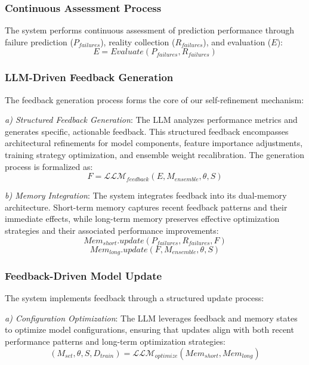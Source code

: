 \documentclass[conference]{IEEEtran}
\begin{document}
\subsubsection{Continuous Assessment Process}
The system performs continuous assessment of prediction performance through failure prediction ($P_{failures}$), reality collection ($R_{failures}$), and evaluation ($E$):
\begin{equation}
    E = Evaluate(P_{failures}, R_{failures})
\end{equation}

\subsubsection{LLM-Driven Feedback Generation}
The feedback generation process forms the core of our self-refinement mechanism:

\textit{a) Structured Feedback Generation}: The LLM analyzes performance metrics and generates specific, actionable feedback. This structured feedback encompasses architectural refinements for model components, feature importance adjustments, training strategy optimization, and ensemble weight recalibration. The generation process is formalized as:
\begin{equation}
    F = \mathcal{LLM}_{feedback}(E, M_{ensemble}, \theta, S)
\end{equation}

\textit{b) Memory Integration}: The system integrates feedback into its dual-memory architecture. Short-term memory captures recent feedback patterns and their immediate effects, while long-term memory preserves effective optimization strategies and their associated performance improvements:
\begin{equation}
    Mem_{short}.update(P_{failures}, R_{failures}, F)
\end{equation}
\begin{equation}
    Mem_{long}.update(F, M_{ensemble}, \theta, S)
\end{equation}

\subsubsection{Feedback-Driven Model Update}
The system implements feedback through a structured update process:

\textit{a) Configuration Optimization}: The LLM leverages feedback and memory states to optimize model configurations, ensuring that updates align with both recent performance patterns and long-term optimization strategies:
\begin{equation}
    (M_{set}, \theta, S, D_{train}) = \mathcal{LLM}_{optimize}(Mem_{short}, Mem_{long})
\end{equation}
\end{document}
